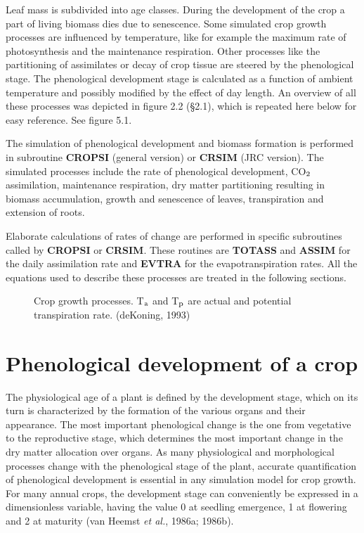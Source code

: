 Leaf mass is subdivided into age classes. During the development of the crop a part of
living biomass dies due to senescence. Some simulated crop growth processes are
influenced by temperature, like for example the maximum rate of photosyn\-thesis and the
maintenance respiration. Other processes like the partitioning of assimilates or decay of
crop tissue are steered by the pheno\-log\-ical stage. The phenological development stage is
calculated as a function of ambient temperature and possibly modified by the effect of day
length. An overview of all these processes was depicted in figure 2.2 (\S 2.1), which is
repeated here below for easy reference. See figure 5.1.

The simulation of phenological development and biomass formation is performed in
subroutine {\bf CROPSI} (general version) or {\bf CRSIM} (JRC version). The simulated process\-es
include the rate of pheno\-logical develop\-ment, CO$_{{\rm 2}}$ assimilation, mainte\-nance respiration,
dry matter partition\-ing resulting in biomass accumulation, growth and senescence of
leaves, transpiration and extension of roots. 

Elaborate calculations of rates of change are performed in specific subroutines called by
{\bf CROPSI} or {\bf CRSIM}. These routines are {\bf TOTASS} and {\bf ASSIM} for the daily assimilation
rate and {\bf EVTRA} for the evapotranspiration rates. All the equations used to describe these
processes are treated in the following sections.

\begin{figure}[htbp]
\caption{Crop growth pro\-cesses. {\small T$_{{\rm a}}$ and T$_{{\rm p}}$ are actual and potential 
transpiration rate.} (deKoning, 1993)}
 \begin{center} \end{center}
\end{figure}

\section{Phenological development of a crop}

The physio\-logical age of a plant is defined by the development stage, which on its turn is
characterized by the forma\-tion of the various organs and their appear\-ance. The most
important phenological change is the one from vegetative to the reproduc\-tive stage, which
determines the most important change in the dry matter allocation over organs. As many
physiologi\-cal and morphological processes change with the phenological stage of the
plant, accurate quantification of phenological development is essential in any simulation
model for crop growth. For many annual crops, the development stage can conveniently
be expressed in a dimensionless variable, having the value 0 at seedling emergence, 1 at
flowering and 2 at maturity (van Heemst {\it et al.}, 1986a; 1986b). 

